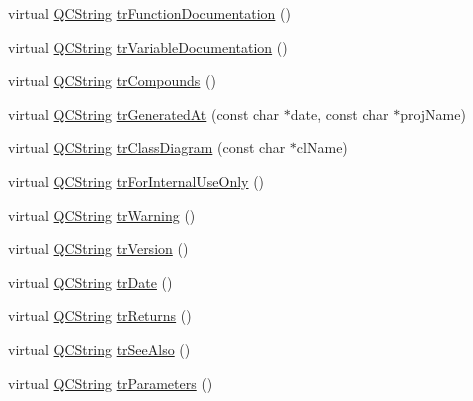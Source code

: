 \begin{DoxyCompactItemize}
\item 
virtual \mbox{\hyperlink{class_q_c_string}{Q\+C\+String}} \mbox{\hyperlink{class_translator_chinesetraditional_aaf0f3a0b1de5254a585b8d52e23ac099}{tr\+Function\+Documentation}} ()
\item 
virtual \mbox{\hyperlink{class_q_c_string}{Q\+C\+String}} \mbox{\hyperlink{class_translator_chinesetraditional_ae5208cf0363e243cbdfe3a807617a5eb}{tr\+Variable\+Documentation}} ()
\item 
virtual \mbox{\hyperlink{class_q_c_string}{Q\+C\+String}} \mbox{\hyperlink{class_translator_chinesetraditional_a209bcee5ed6aa0f9115fa0a72b836680}{tr\+Compounds}} ()
\item 
virtual \mbox{\hyperlink{class_q_c_string}{Q\+C\+String}} \mbox{\hyperlink{class_translator_chinesetraditional_abdf25e644767881938756a31d5e0cd44}{tr\+Generated\+At}} (const char $\ast$date, const char $\ast$proj\+Name)
\item 
virtual \mbox{\hyperlink{class_q_c_string}{Q\+C\+String}} \mbox{\hyperlink{class_translator_chinesetraditional_a6f4b433d3229bfebfb764814f8399f41}{tr\+Class\+Diagram}} (const char $\ast$cl\+Name)
\item 
virtual \mbox{\hyperlink{class_q_c_string}{Q\+C\+String}} \mbox{\hyperlink{class_translator_chinesetraditional_a4a4be7e08a61015f2354d202a070f2eb}{tr\+For\+Internal\+Use\+Only}} ()
\item 
virtual \mbox{\hyperlink{class_q_c_string}{Q\+C\+String}} \mbox{\hyperlink{class_translator_chinesetraditional_a5007553b6683b60e83d5f09198943f8f}{tr\+Warning}} ()
\item 
virtual \mbox{\hyperlink{class_q_c_string}{Q\+C\+String}} \mbox{\hyperlink{class_translator_chinesetraditional_a45e0e25d032f75149f367710c81eaf60}{tr\+Version}} ()
\item 
virtual \mbox{\hyperlink{class_q_c_string}{Q\+C\+String}} \mbox{\hyperlink{class_translator_chinesetraditional_ab03266211496908f24b94b4b3143ddb9}{tr\+Date}} ()
\item 
virtual \mbox{\hyperlink{class_q_c_string}{Q\+C\+String}} \mbox{\hyperlink{class_translator_chinesetraditional_ad88945dcceb6d0e446b8ff4e2767133a}{tr\+Returns}} ()
\item 
virtual \mbox{\hyperlink{class_q_c_string}{Q\+C\+String}} \mbox{\hyperlink{class_translator_chinesetraditional_ac0396dc7e8551600fb718e8a555fa392}{tr\+See\+Also}} ()
\item 
virtual \mbox{\hyperlink{class_q_c_string}{Q\+C\+String}} \mbox{\hyperlink{class_translator_chinesetraditional_a0470e477f7a67716fe4c4f7f232ba1d2}{tr\+Parameters}} ()

\end{DoxyCompactItemize}
